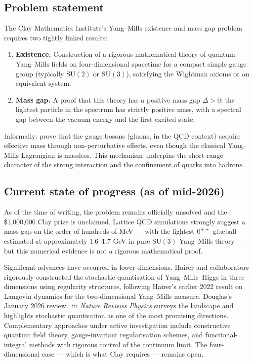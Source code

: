 \documentclass[11pt,a4paper,onecolumn]{article}
\theoremstyle{plain}
\theoremstyle{definition}
\theoremstyle{remark}
\begin{document}
\subsection{Problem statement}

The Clay Mathematics Institute's Yang--Mills existence and mass gap
problem~\cite{jaffe2000} requires two tightly linked results:

\begin{enumerate}
\item[(E)] \textbf{Existence.} Construction of a rigorous mathematical
  theory of quantum Yang--Mills fields on four-dimensional spacetime
  for a compact simple gauge group (typically $\mathrm{SU}(2)$ or
  $\mathrm{SU}(3)$), satisfying the Wightman axioms or an equivalent
  system.
\item[(G)] \textbf{Mass gap.} A proof that this theory has a positive
  mass gap $\Delta > 0$: the lightest particle in the spectrum has
  strictly positive mass, with a spectral gap between the vacuum energy
  and the first excited state.
\end{enumerate}

Informally: prove that the gauge bosons (gluons, in the QCD context)
acquire effective mass through non-perturbative effects, even though
the classical Yang--Mills Lagrangian is massless. This mechanism
underpins the short-range character of the strong interaction and the
confinement of quarks into hadrons.

\subsection{Current state of progress (as of mid-2026)}

As of the time of writing, the problem remains officially unsolved and
the \$1{,}000{,}000 Clay prize is unclaimed. Lattice QCD simulations
strongly suggest a mass gap on the order of hundreds of MeV --- with
the lightest $0^{++}$ glueball estimated at approximately $1.6$--$1.7$
GeV in pure $\mathrm{SU}(3)$ Yang--Mills theory --- but this
numerical evidence is not a rigorous mathematical proof.

Significant advances have occurred in lower dimensions. Hairer and
collaborators~\cite{hairer2024} rigorously constructed the
stochastic quantisation of Yang--Mills--Higgs in three dimensions using
regularity structures, following Hairer's earlier 2022 result on Langevin
dynamics for the two-dimensional Yang--Mills measure. Douglas's
January 2026 review~\cite{douglas2026} in
\emph{Nature Reviews Physics} surveys the landscape and highlights
stochastic quantisation as one of the most promising directions.
Complementary approaches under active investigation include
constructive quantum field theory, gauge-invariant regularisation
schemes, and functional-integral methods with rigorous control of the
continuum limit. The four-dimensional case --- which is what Clay
requires --- remains open.
\end{document}
